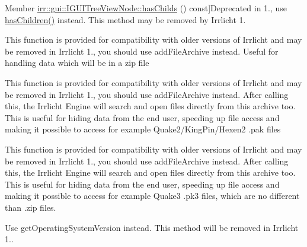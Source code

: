 \begin{DoxyRefList}
Member \hyperlink{classirr_1_1gui_1_1IGUITreeViewNode_a7a771fc86d39a62487184bc56bcf8c52}{irr\+:\+:gui\+:\+:I\+G\+U\+I\+Tree\+View\+Node\+:\+:has\+Childs} () const]Deprecated in 1., use \hyperlink{classirr_1_1gui_1_1IGUITreeViewNode_a64244b92443fefbd06c910daf5db3c5f}{has\+Children()} instead. This method may be removed by Irrlicht 1.  
\item[\label{deprecated__deprecated000003}%
\Hypertarget{deprecated__deprecated000003}%
Member \hyperlink{classirr_1_1io_1_1IFileSystem_a7b5235a1473ff67d97f1487211762723}{irr\+:\+:io\+:\+:I\+File\+System\+:\+:add\+Folder\+File\+Archive} (const c8 $\ast$filename, bool ignore\+Case=true, bool ignore\+Paths=true)]This function is provided for compatibility with older versions of Irrlicht and may be removed in Irrlicht 1., you should use add\+File\+Archive instead. Useful for handling data which will be in a zip file  
\item[\label{deprecated__deprecated000004}%
\Hypertarget{deprecated__deprecated000004}%
Member \hyperlink{classirr_1_1io_1_1IFileSystem_a5ade21d59a80b16965d57d1977ad6cc4}{irr\+:\+:io\+:\+:I\+File\+System\+:\+:add\+Pak\+File\+Archive} (const c8 $\ast$filename, bool ignore\+Case=true, bool ignore\+Paths=true)]This function is provided for compatibility with older versions of Irrlicht and may be removed in Irrlicht 1., you should use add\+File\+Archive instead. After calling this, the Irrlicht Engine will search and open files directly from this archive too. This is useful for hiding data from the end user, speeding up file access and making it possible to access for example Quake2/\+King\+Pin/\+Hexen2 .pak files  
\item[\label{deprecated__deprecated000002}%
\Hypertarget{deprecated__deprecated000002}%
Member \hyperlink{classirr_1_1io_1_1IFileSystem_aef11ff9b5c171d7b3a99d8a79b71f2b3}{irr\+:\+:io\+:\+:I\+File\+System\+:\+:add\+Zip\+File\+Archive} (const c8 $\ast$filename, bool ignore\+Case=true, bool ignore\+Paths=true)]This function is provided for compatibility with older versions of Irrlicht and may be removed in Irrlicht 1., you should use add\+File\+Archive instead. After calling this, the Irrlicht Engine will search and open files directly from this archive too. This is useful for hiding data from the end user, speeding up file access and making it possible to access for example Quake3 .pk3 files, which are no different than .zip files.  
\item[\label{deprecated__deprecated000016}%
\Hypertarget{deprecated__deprecated000016}%
Member \hyperlink{classirr_1_1IOSOperator_a8d634ee79439742b7397ca7ad7a3812a}{irr\+:\+:I\+O\+S\+Operator\+:\+:get\+Operation\+System\+Version} () const]Use get\+Operating\+System\+Version instead. This method will be removed in Irrlicht 1..  

\end{DoxyRefList}
